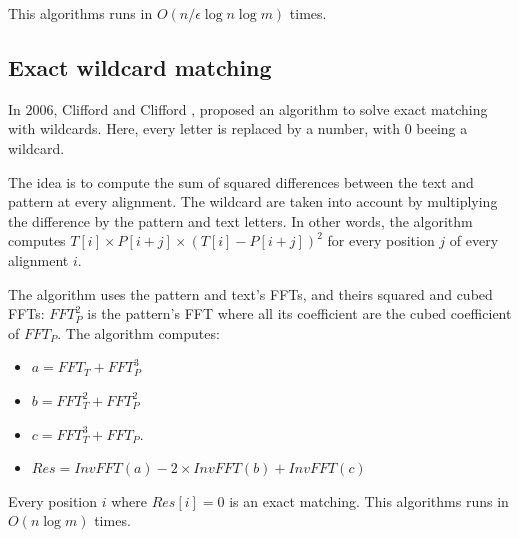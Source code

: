 \documentclass[preprint,12pt]{elsarticle}
\begin{document}
This algorithms runs in $O(n / \epsilon \log n \log m)$ times.








\subsection{Exact wildcard matching}

In $2006$, Clifford and Clifford \cite{WC}, proposed an algorithm to solve
exact matching with wildcards.
Here, every letter is replaced by a number, with $0$ beeing a wildcard.

The idea is to compute the sum of squared differences between the text and pattern
at every alignment.
The wildcard are taken into account by multiplying the difference by the pattern and text letters.
In other words, the algorithm computes $T[i] \times P[i+j] \times (T[i] - P[i+j])^2$
for every position $j$ of every alignment $i$.

The algorithm uses the pattern and text's FFTs, and theirs squared and cubed FFTs:
$FFT^2_P$ is the pattern's FFT where all its coefficient are the cubed coefficient of $FFT_P$.
The algorithm computes: 
\begin{itemize}
\setlength\itemsep{0.1em}
\item $a = FFT_T+ FFT^3_P$
\item $b = FFT^2_T+ FFT^2_P$
\item $c = FFT^3_T+ FFT_P$.
\item $Res = InvFFT(a) - 2 \times InvFFT(b) + InvFFT(c)$
\end{itemize}

Every position $i$ where $Res[i] = 0$ is an exact matching.
This algorithms runs in $O(n \log m)$ times.
\end{document}
